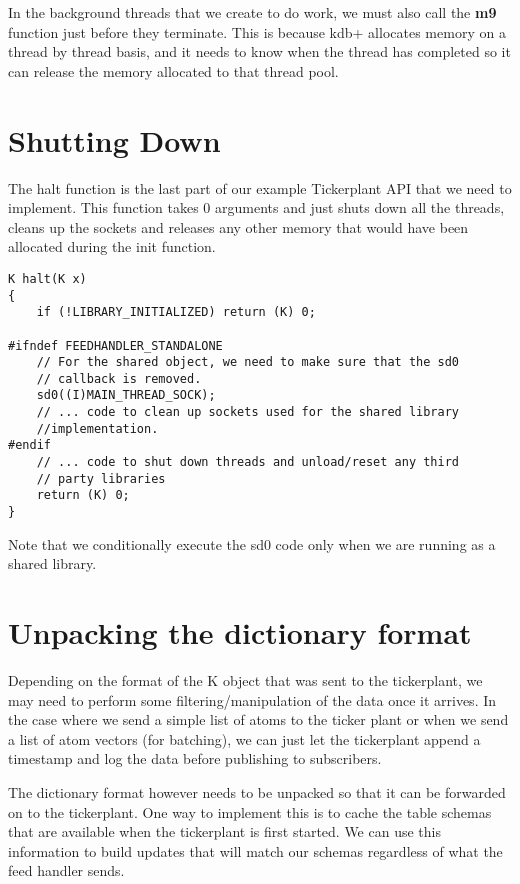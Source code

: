 In the background threads that we create to do work, we must also call the \textbf{m9} function just before they terminate. This is because kdb+ allocates memory on a thread by thread basis, and it needs to know when the thread has completed so it can release the memory allocated to that thread pool.

\section{Shutting Down}

The halt function is the last part of our example Tickerplant API that we need to implement. This function takes 0 arguments
and just shuts down all the threads, cleans up the sockets and releases any other memory that would have been allocated during
the init function.

\begin{lstlisting}
K halt(K x)
{
	if (!LIBRARY_INITIALIZED) return (K) 0;

#ifndef FEEDHANDLER_STANDALONE
	// For the shared object, we need to make sure that the sd0
	// callback is removed.
	sd0((I)MAIN_THREAD_SOCK);
	// ... code to clean up sockets used for the shared library
	//implementation.
#endif
	// ... code to shut down threads and unload/reset any third
	// party libraries
	return (K) 0;
}
\end{lstlisting}

Note that we conditionally execute the sd0 code only when we are running as a shared library.

\section{Unpacking the dictionary format}

Depending on the format of the K object that was sent to the tickerplant, we may need to perform some filtering/manipulation of
the data once it arrives. In the case where we send a simple list of atoms to the ticker plant or when we send a list of atom
vectors (for batching), we can just let the tickerplant append a timestamp and log the data before publishing to subscribers.

The dictionary format however needs to be unpacked so that it can be forwarded on to the tickerplant. One way to implement this
is to cache the table schemas that are available when the tickerplant is first started. We can use this information to build
updates that will match our schemas regardless of what the feed handler sends.

